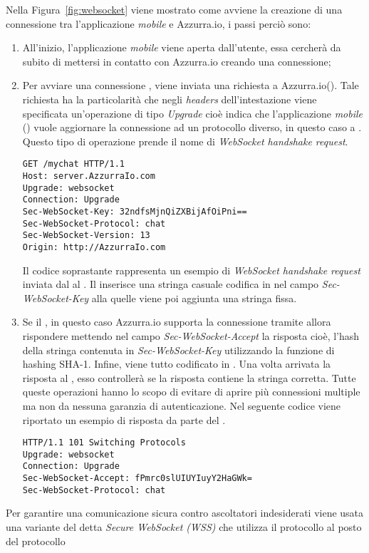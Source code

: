 Nella Figura~\ref{fig:websocket} viene mostrato come avviene la creazione di una connessione tra l'applicazione \emph{mobile} e Azzurra.io, i passi perciò sono:
\begin{enumerate}
	\item All'inizio, l'applicazione \emph{mobile} viene aperta dall'utente, essa cercherà da subito di mettersi in contatto con Azzurra.io creando una connessione;
	\item Per avviare una connessione , viene inviata una richiesta  a Azzurra.io(). Tale richiesta  ha la particolarità che negli \emph{headers} dell’intestazione viene specificata un'operazione di tipo \emph{Upgrade} cioè indica che l'applicazione \emph{mobile} () vuole aggiornare la connessione ad un protocollo diverso, in questo caso a . Questo tipo di operazione prende il nome di \emph{WebSocket handshake request}.\\
	\begin{lstlisting}
GET /mychat HTTP/1.1
Host: server.AzzurraIo.com
Upgrade: websocket	
Connection: Upgrade		
Sec-WebSocket-Key: 32ndfsMjnQiZXBijAfOiPni==
Sec-WebSocket-Protocol: chat		
Sec-WebSocket-Version: 13		
Origin: http://AzzurraIo.com
	\end{lstlisting}
	Il codice soprastante rappresenta un esempio di \emph{WebSocket handshake request} inviata dal  al . Il  inserisce una stringa casuale codifica in  nel campo \emph{Sec-WebSocket-Key} alla quelle viene poi aggiunta una stringa fissa.
	\item Se il , in questo caso Azzurra.io supporta la connessione tramite  allora rispondere mettendo nel campo \emph{Sec-WebSocket-Accept} la risposta cioè, l'hash della stringa contenuta in \emph{Sec-WebSocket-Key} utilizzando la funzione di hashing SHA-1. Infine, viene tutto codificato in . Una volta arrivata la risposta al , esso controllerà se la risposta contiene la stringa corretta. Tutte queste operazioni hanno lo scopo di evitare di aprire più connessioni multiple ma non da nessuna garanzia di autenticazione.
	Nel seguente codice viene riportato un esempio di risposta da parte del .\\
	\begin{lstlisting}
HTTP/1.1 101 Switching Protocols
Upgrade: websocket
Connection: Upgrade
Sec-WebSocket-Accept: fPmrc0slUIUYIuyY2HaGWk=
Sec-WebSocket-Protocol: chat
	\end{lstlisting}
\end{enumerate}
Per garantire una comunicazione sicura contro ascoltatori indesiderati viene usata una variante del  detta \emph{Secure WebSocket (WSS)} che utilizza il protocollo  al posto del protocollo 
